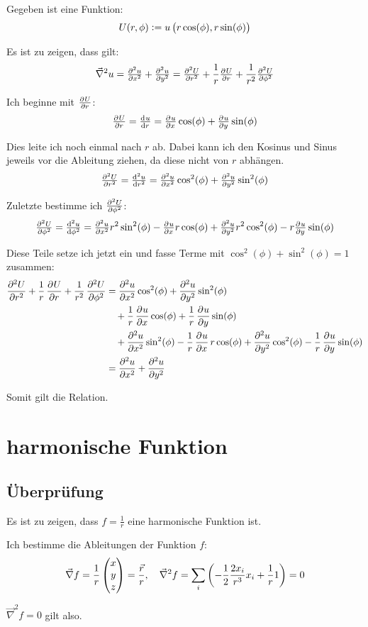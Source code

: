 \documentclass[11pt, ngerman]{article}
\newcommand{\laplace}{\vnabla^2}
\newcommand{\vnabla}{\vec \nabla}
\begin{document}
Gegeben ist eine Funktion:
\[
	U(r, \phi) := u\del{r \cos(\phi), r \sin(\phi)}
\]

Es ist zu zeigen, dass gilt:
\[
	\laplace u = \pd[2] ux + \pd[2] uy = \pd[2] Ur + \frac 1r \pd Ur + \frac
	1{r^2} \pd[2] U\phi
\]

Ich beginne mit $\pd U r$:
\[
	\pd Ur = \od ur = \pd ux \cos(\phi) + \pd uy \sin(\phi)
\]

Dies leite ich noch einmal nach $r$ ab. Dabei kann ich den Kosinus und Sinus
jeweils vor die Ableitung ziehen, da diese nicht von $r$ abhängen.
\[
	\pd[2] Ur = \od[2] ur = \pd[2] ux \cos^2(\phi) + \pd[2] uy \sin^2(\phi)
\]

Zuletzte bestimme ich $\pd[2] U\phi$:
\[
	\pd[2] U\phi = \od[2] u\phi = \pd[2] ux r^2 \sin^2(\phi) - \pd ux r
	\cos(\phi) + \pd[2] uy r^2 \cos^2(\phi) - r \pd uy \sin(\phi)
\]

Diese Teile setze ich jetzt ein und fasse Terme mit $\cos^2(\phi) +
\sin^2(\phi) = 1$ zusammen:
%
\begin{align*}
	\dpd[2] Ur + \frac 1r \dpd Ur + \frac 1{r^2} \dpd[2] U\phi
	&=\dpd[2] ux \cos^2(\phi) + \dpd[2] uy \sin^2(\phi) \\
	&\quad+ \frac 1r \dpd ux \cos(\phi) + \frac 1r \dpd uy \sin(\phi) \\
	&\quad+ \dpd[2] ux \sin^2(\phi) - \frac 1r \dpd ux r \cos(\phi) + \dpd[2]
	uy \cos^2(\phi) - \frac 1r \dpd uy \sin(\phi) \\
	&= \dpd[2] ux + \dpd[2] uy
\end{align*}

Somit gilt die Relation.

\section{harmonische Funktion}

\subsection{Überprüfung}

Es ist zu zeigen, dass $f = \frac 1r$ eine harmonische Funktion ist.

Ich bestimme die Ableitungen der Funktion $f$:
\[
	\vnabla f = \frac{1}{r} \begin{pmatrix}
		x \\ y \\ z
	\end{pmatrix} = \frac{\vec r}{r}
	,\quad
	\laplace f = \sum_i \del{- \frac12 \frac{2x_i}{r^3} x_i + \frac 1r 1} = 0
\]

$\laplace f = 0$ gilt also.
\end{document}

